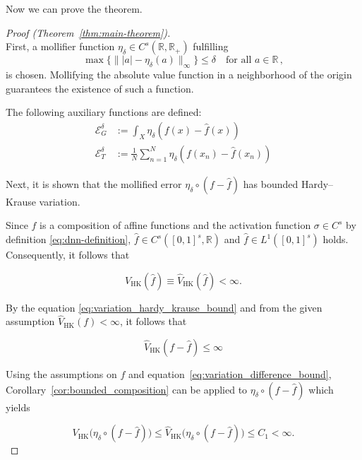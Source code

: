 Now we can prove the theorem.
\begin{proof}[Proof (Theorem~\ref{thm:main-theorem})] \ \\
    First, a mollifier function $\eta_\delta \in C^s(\mathbb{R},
    \mathbb{R}_+)$ fulfilling
    \begin{equation*}
        \max \big\{\big\| |a| - \eta_\delta(a) \big\|_\infty\big\} \leq \delta \quad \text{for all } a\in\mathbb{R}\,,
    \end{equation*}
    is chosen. Mollifying the absolute value function in a neighborhood of the
    origin guarantees the existence of such a function. 
   
    The following auxiliary functions are defined:
    \begin{align*}
        \mathcal{E}_G^\delta &:= \int_X \eta_\delta(f(x) - \hat{f}(x)) \\
        \mathcal{E}_T^\delta &:= \frac{1}{N} \sum_{n=1}^N \eta_\delta(f(x_n) - \hat{f}(x_n))
    \end{align*}

    Next, it is shown that the mollified error $\eta_\delta\circ(f-\hat{f})$ has
    bounded Hardy--Krause variation.
    
    Since $\hat{f}$ is a composition of affine functions and the activation
    function $\sigma \in C^s$ by definition \eqref{eq:dnn-definition}, $\hat{f}
    \in C^s([0,1]^s, \mathbb{R})$ and $\hat{f}\in L^1([0,1]^s)$ holds.
    Consequently, it follows that 

    \begin{equation*}
        {V}_{\mathrm{HK}}(\hat{f}) \equiv \widehat{V}_{\mathrm{HK}}(\hat{f}) <
        \infty.
    \end{equation*}

    By the equation \eqref{eq:variation_hardy_krause_bound} and from the given
    assumption $\widehat{V}_{\mathrm{HK}}(f) < \infty$, it follows that
    
    \begin{equation}
        \widehat{V}_{\mathrm{HK}}(f-\hat{f}) \leq \infty
    \label{eq:variation_difference_bound}
    \end{equation}

    Using the assumptions on $f$ and equation~\eqref{eq:variation_difference_bound}, Corollary~\ref{cor:bounded_composition} can be applied to $\eta_\delta \circ (f-\hat{f})$ which yields 
    
    \begin{equation*}
    V_{\mathrm{HK}}\big(\eta_\delta\circ(f-\hat{f})\big) \leq \widehat{V}_{\mathrm{HK}}\big(\eta_\delta\circ(f-\hat{f})\big) \leq C_1 < \infty.
    \end{equation*}


\end{proof}
